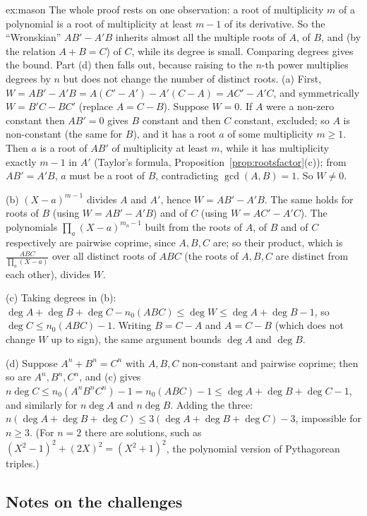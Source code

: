 \begin{solution}{ex:mason}
\idea The whole proof rests on one observation: a root of multiplicity $m$ of a polynomial is a root of multiplicity at least $m-1$ of its derivative. So the ``Wronskian'' $AB'-A'B$ inherits almost all the multiple roots of $A$, of $B$, and (by the relation $A+B=C$) of $C$, while its degree is small. Comparing degrees gives the bound. Part (d) then falls out, because raising to the $n$-th power multiplies degrees by $n$ but does not change the number of distinct roots.
\writeup (a) First, $W=AB'-A'B=A(C'-A')-A'(C-A)=AC'-A'C$, and symmetrically $W=B'C-BC'$ (replace $A=C-B$). Suppose $W=0$. If $A$ were a non-zero constant then $AB'=0$ gives $B$ constant and then $C$ constant, excluded; so $A$ is non-constant (the same for $B$), and it has a root $a$ of some multiplicity $m\ge1$. Then $a$ is a root of $AB'$ of multiplicity at least $m$, while it has multiplicity exactly $m-1$ in $A'$ (Taylor's formula, Proposition~\ref{prop:rootsfactor}(c)); from $AB'=A'B$, $a$ must be a root of $B$, contradicting $\gcd(A,B)=1$. So $W\ne0$.

(b) $(X-a)^{m-1}$ divides $A$ and $A'$, hence $W=AB'-A'B$. The same holds for roots of $B$ (using $W=AB'-A'B$) and of $C$ (using $W=AC'-A'C$). The polynomials $\prod_a(X-a)^{m_a-1}$ built from the roots of $A$, of $B$ and of $C$ respectively are pairwise coprime, since $A,B,C$ are; so their product, which is $\frac{ABC}{\prod_a(X-a)}$ over all distinct roots of $ABC$ (the roots of $A,B,C$ are distinct from each other), divides $W$.

(c) Taking degrees in (b): $\deg A+\deg B+\deg C-n_0(ABC)\le\deg W\le\deg A+\deg B-1$, so $\deg C\le n_0(ABC)-1$. Writing $B=C-A$ and $A=C-B$ (which does not change $W$ up to sign), the same argument bounds $\deg A$ and $\deg B$.

(d) Suppose $A^n+B^n=C^n$ with $A,B,C$ non-constant and pairwise coprime; then so are $A^n,B^n,C^n$, and (c) gives $n\deg C\le n_0(A^nB^nC^n)-1=n_0(ABC)-1\le\deg A+\deg B+\deg C-1$, and similarly for $n\deg A$ and $n\deg B$. Adding the three: $n(\deg A+\deg B+\deg C)\le3(\deg A+\deg B+\deg C)-3$, impossible for $n\ge3$. (For $n=2$ there are solutions, such as $(X^2-1)^2+(2X)^2=(X^2+1)^2$, the polynomial version of Pythagorean triples.)
\end{solution}

\subsection*{Notes on the challenges}

